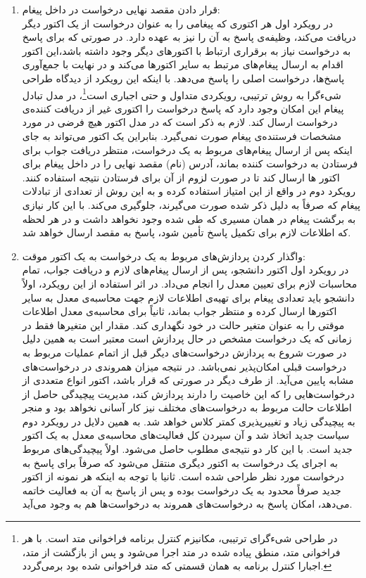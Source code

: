 \begin{enumerate}
\item قرار دادن مقصد نهایی درخواست در داخل پیغام:\\
در رویکرد اول هر اکتوری که پیغامی را به عنوان درخواست از یک اکتور دیگر دریافت می‌کند، وظیفه‌ی پاسخ به آن را نیز به عهده دارد. در صورتی که برای پاسخ به درخواست نیاز به برقراری ارتباط با اکتورهای دیگر وجود داشته باشد،‌این اکتور اقدام به ارسال پیغام‌های مرتبط به سایر اکتورها می‌کند و در نهایت با جمع‌آوری پاسخ‌ها، درخواست اصلی را پاسخ می‌دهد. با اینکه این رویکرد از دیدگاه طراحی شیءگرا به روش ترتیبی،‌ رویکردی متداول و حتی اجباری است\footnote{در طراحی شیءگرای ترتیبی، مکانیزم کنترل برنامه فراخوانی متد است. با هر فراخوانی متد، منطق پیاده شده در متد اجرا می‌شود و پس از بازگشت از متد، اجبارا کنترل برنامه به همان قسمتی که متد فراخوانی شده بود برمی‌گردد.}، در مدل تبادل پیغام این امکان وجود دارد که پاسخ درخواست را اکتوری غیر از دریافت کننده‌ی درخواست ارسال کند. لازم به ذکر است که در مدل اکتور هیچ فرضی در مورد مشخصات فرستنده‌ی پیغام صورت نمی‌گیرد. بنابراین یک اکتور می‌تواند به جای اینکه پس از ارسال پیغام‌های مربوط به یک درخواست، منتظر دریافت جواب برای فرستادن به درخواست کننده بماند،‌ آدرس (نام) مقصد نهایی را در داخل پیغام برای اکتور ها ارسال کند تا در صورت لزوم از آن برای فرستادن نتیجه استفاده کنند. رویکرد دوم در واقع از این امتیاز استفاده کرده و به این روش از تعدادی از تبادلات پیغام که صرفاً به دلیل ذکر شده صورت می‌گیرند، جلوگیری می‌کند. با این کار نیازی به برگشت پیغام در همان مسیری که طی شده وجود نخواهد داشت و در هر لحظه که اطلاعات لازم برای تکمیل پاسخ تأمین شود، پاسخ به مقصد ارسال خواهد شد.
\item واگذار کردن پردازش‌های مربوط به یک درخواست به یک اکتور موقت:\\
 در رویکرد اول اکتور دانشجو، پس از ارسال پیغام‌های لازم و دریافت جواب، تمام محاسبات لازم برای تعیین معدل را انجام ‌می‌داد. در اثر استفاده از این رویکرد، اولاً دانشجو باید تعدادی پیغام برای تهیه‌ی اطلاعات لازم جهت محاسبه‌ی معدل به سایر اکتورها ارسال کرده و منتظر جواب بماند، ثانیاً برای محاسبه‌ی معدل اطلاعات موقتی را به عنوان متغیر حالت در خود نگهداری کند. مقدار این متغیر‌ها فقط در زمانی که یک درخواست مشخص در حال پردازش است معتبر است به همین دلیل در صورت شروع به پردازش درخواست‌های دیگر قبل از اتمام عملیات مربوط به درخواست قبلی امکان‌پذیر نمی‌باشد. در نتیجه میزان همروندی در درخواست‌های مشابه پایین می‌آید. از طرف دیگر در صورتی که قرار باشد، اکتور انواع متعددی از درخواست‌هایی را که این خاصیت را دارند پردازش کند، مدیریت پیچیدگی حاصل از اطلاعات حالت مربوط به درخواست‌های مختلف نیز کار آسانی نخواهد بود و منجر به پیچیدگی زیاد  و تغییرپذیری کمتر کلاس خواهد شد. به همین دلایل در رویکرد دوم سیاست جدید اتخاذ شد و آن سپردن کل فعالیت‌های محاسبه‌ی معدل به یک اکتور جدید است. با این کار دو نتیجه‌ی مطلوب حاصل می‌شود. اولاً پیچیدگی‌های مربوط به اجرای یک درخواست به اکتور دیگری منتقل می‌شود که صرفاً برای پاسخ به درخواست مورد نظر طراحی شده است. ثانیا با توجه به اینکه هر نمونه از اکتور جدید صرفاً محدود به یک درخواست بوده و پس از پاسخ به‌ آن به فعالیت خاتمه می‌دهد، امکان پاسخ به درخواست‌های همروند به درخواست‌ها هم به وجود می‌آید.
\end{enumerate}
